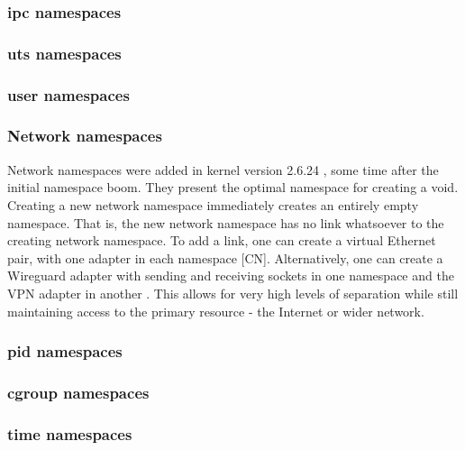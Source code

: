 \documentclass[sigplan]{acmart}
\begin{document}
\subsubsection{ipc namespaces}


\subsubsection{uts namespaces}


\subsubsection{user namespaces}


\subsubsection{Network namespaces}

Network namespaces were added in kernel version 2.6.24 \citep{noauthor_linux_2008}, some time after the initial namespace boom. They present the optimal namespace for creating a void. Creating a new network namespace immediately creates an entirely empty namespace. That is, the new network namespace has no link whatsoever to the creating network namespace. To add a link, one can create a virtual Ethernet pair, with one adapter in each namespace [CN]. Alternatively, one can create a Wireguard adapter with sending and receiving sockets in one namespace and the VPN adapter in another \citep[§7.3]{donenfeld_wireguard_2017}. This allows for very high levels of separation while still maintaining access to the primary resource - the Internet or wider network.

\subsubsection{pid namespaces}


\subsubsection{cgroup namespaces}


\subsubsection{time namespaces}
\end{document}
